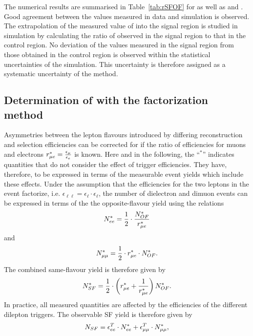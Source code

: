 The numerical results are summarised in Table~\ref{tab:rSFOF} for \Rsfof as well as \Reeof and \Rmmof. Good agreement between the values measured in data and simulation is observed. The extrapolation of the measured value of \Rsfof into the signal region is studied in simulation by calculating the ratio of \Rsfof observed in the signal region to that in the control region. No deviation of the values measured in the signal region from those obtained in the control region is observed within the statistical uncertainties of the simulation. This uncertainty is therefore assigned as a systematic uncertainty of the method. 



\subsection{Determination of \Rsfof with the factorization method}
\label{sec:rmue}
Asymmetries between the lepton flavours introduced by differing reconstruction and selection efficiencies can be corrected for if the ratio of efficiencies for muons and electrons $r_{\mu e}^{*} = \frac{\epsilon_{\mu}}{\epsilon_{e}}$ is known. Here and in the following, the ``$^{*}$'' indicates quantities that do not consider the effect of trigger efficiencies. They have, therefore, to be expressed in terms of the measurable event yields which include these effects. Under the assumption that the efficiencies for the two leptons in the event factorize, i.e. $\epsilon_{\ell\ell} = \epsilon_{\ell}\cdot\epsilon_{\ell}$, the number of dielectron and dimuon events can be expressed in terms of the the opposite-flavour yield using the relations
\begin{equation}
N_{ee}^{*} = \frac{1}{2}\cdot \frac{N_{OF}^{*}}{r_{\mu e}^{*}}
\end{equation}
and 
\begin{equation}
N_{\mu\mu}^{*} = \frac{1}{2} \cdot r_{\mu e}^{*} \cdot N_{OF}^{*}.
\end{equation}
The combined same-flavour yield is therefore given by
\begin{equation}
N_{SF}^{*} = \frac{1}{2}\cdot \left( r_{\mu e}^{*} + \frac{1}{r_{\mu e}^{*}} \right) N_{OF}^{*}.
\end{equation}
In practice, all measured quantities are affected by the efficiencies of the different dilepton triggers. The observable SF yield is therefore given by
\begin{equation}
N_{SF} = \epsilon_{ee}^T \cdot N_{ee}^{*} + \epsilon_{\mu\mu}^T \cdot N_{\mu\mu}^{*},
\end{equation}
